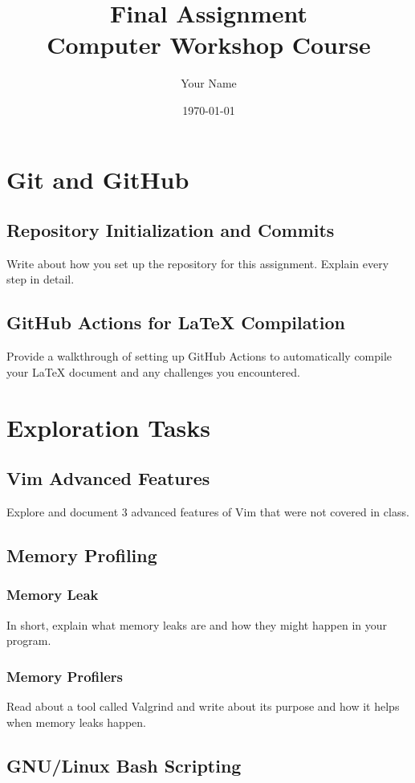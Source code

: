 \documentclass{article}
\title{Final Assignment \\ Computer Workshop Course}
\author{Your Name}
\date{\today}
\begin{document}
\maketitle
\tableofcontents
\newpage

\section{Git and GitHub}
\subsection{Repository Initialization and Commits}
Write about how you set up the repository for this assignment. Explain every step in detail.

\subsection{GitHub Actions for LaTeX Compilation}
Provide a walkthrough of setting up GitHub Actions to automatically compile your LaTeX document and any challenges you encountered.

\section{Exploration Tasks}
\subsection{Vim Advanced Features}
Explore and document 3 advanced features of Vim that were not covered in class.

\subsection{Memory Profiling}
\subsubsection{Memory Leak}
In short, explain what memory leaks are and how they might happen in your program.

\subsubsection{Memory Profilers}
Read about a tool called Valgrind and write about its purpose and how it helps when memory leaks happen.

\subsection{GNU/Linux Bash Scripting}
\end{document}
